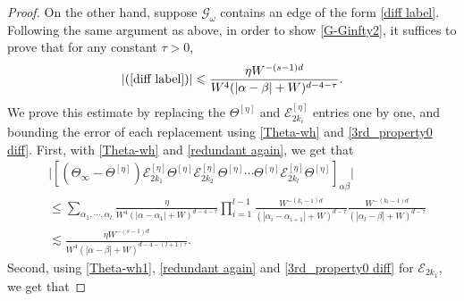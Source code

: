 \documentclass{article}
\newcommand{\1}{\mathds{1}}
\numberwithin{equation}{section}
\newcommand{\al}{\alpha}
\newcommand{\be}{\begin{equation}}
\newcommand{\ee}{\end{equation}}
\renewcommand{\cal}{\mathcal}
\newcommand{\wh}{\widehat}
\newcommand{\wt}{\widetilde}
\renewcommand{\leq}{\leqslant}
\renewcommand{\le}{\leq}
\newcommand{\dashed}{\text{diffusive}}
\theoremstyle{plain} %
\theoremstyle{remark}
\newcommand{\Sdelta}{{\Sigma}_T}
\newcommand{\wtSdelta}{\Sigma}
\newcommand{\Sinfty}{\Sigma^{\infty}}
\newcommand{\wtSinfty}{\wt\Sigma^{\infty}}
\newcommand{\Sele}{{\mathcal E}}
\begin{document}
\begin{proof}
On the other hand, suppose $\cal G_\omega$ contains an edge of the form \eqref{diff label}.
Following the same argument as above, in order to show \eqref{G-Ginfty2}, it suffices to prove that for any constant $\tau>0$,%
\be\label{G-Ginfty3}
|(\ref{diff label})|\le \frac{\eta W^{-(s-1)d}}{W^4(|\al-\beta|+W)^{d-4-\tau}}.
\ee
We prove this estimate by replacing the $\Theta^{[\eta]}$ and $\Sele_{2k_i}^{[\eta]}$ entries one by one, and bounding the error of each replacement using \eqref{Theta-wh} and \eqref{3rd_property0 diff}. 
First, with \eqref{Theta-wh} and \eqref{redundant again}, we get that %
\begin{align*}
& \Big|\left[(\Theta_\infty-\Theta^{[\eta]})   \Sele^{[\eta]}_{2k_1}\Theta^{[\eta]}  \Sele^{[\eta]}_{2k_2}\Theta^{[\eta]} \cdots \Theta^{[\eta]}  \Sele^{[\eta]}_{2k_l}\Theta^{[\eta]}\right]_{\al\beta}\Big| \\
& \le \sum_{\al_1,\cdots, \al_{l}} \frac{\eta }{W^4(|\al-\al_1|+W)^{d-4-\tau}}\prod_{i=1}^{l-1} \frac{W^{-(k_i-1)d}}{(|\al_i-\al_{i+1}|+W)^{d-\tau}}\frac{W^{-(k_l-1)d}}{(|\al_l-\beta|+W)^{d-\tau} } \\
&\lesssim \frac{\eta W^{-(s-1)d}}{W^4 (| \al-\beta|+W)^{d-4-(l+1)\tau}}.
\end{align*}
Second, using \eqref{Theta-wh1}, \eqref{redundant again} and \eqref{3rd_property0 diff} for $\Sele_{2k_1}$, we get that %

\end{proof}
\end{document}

